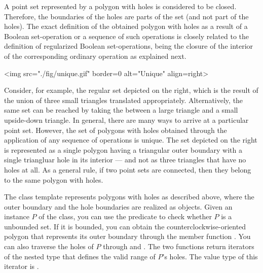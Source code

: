 A point set represented by a polygon with holes is considered to be
closed. Therefore, the boundaries of the holes are parts of the set
(and not part of the holes).
The exact definition of the obtained polygon with holes as a result of
a Boolean set-operation or a sequence of such operations is closely
related to the definition of regularized Boolean set-operations, being
the closure of the interior of the corresponding ordinary operation as
explained next.
\newpage
\lcTex{%
  \setlength{\widthRight}{1.4cm}
  \setlength{\widthLeft}{\widthLineReal}
  \addtolength{\widthLeft}{-\widthRight}
  \begin{minipage}{\widthLeft}
}
\label{fig:unique}
\begin{ccHtmlOnly}
  <img src="./fig/unique.gif" border=0 alt="Unique" align=right>
\end{ccHtmlOnly}
Consider, for example, the regular set depicted on the right, which is
the result of the union of three small triangles translated
appropriately. Alternatively, the same set can be reached by taking
the  between a large triangle and a small
upside-down triangle. In general, there are many ways to arrive at 
a particular point set. However, the set of polygons with holes
obtained through the application of any sequence of operations is
unique. The set depicted on the right is represented as a single
polygon having a triangular outer boundary with a single triangluar
hole in its interior --- and not as three triangles that have no holes
at all. As a general rule, if two point sets are connected, then they
belong to the same polygon with holes.

The class template 
represents polygons with holes as described above, where the outer
boundary and the hole boundaries are realized as
 objects. Given an instance $P$ of
the  class, you can use the predicate
 to check whether $P$ is a unbounded set. If it is
bounded, you can obtain the counterclockwise-oriented polygon that
represents its outer boundary through the member function
. You can also traverse the holes of $P$ through
 and . The two functions return
iterators of the nested type
 that  
defines the valid range of $P$'s holes. The value type of this
iterator is .

